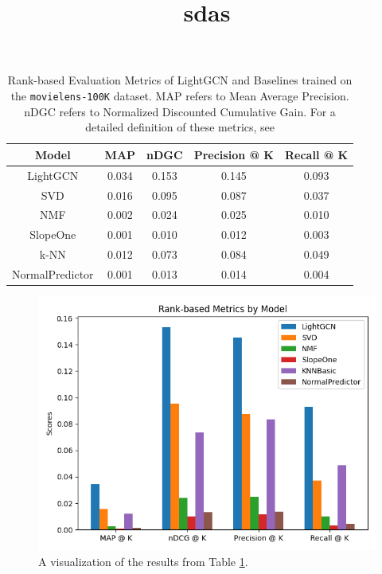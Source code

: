 \documentclass{article}
\begin{document}
\begin{table}[H]
    \centering
        \begin{tabular}{|c c c c c|} 
         \hline
         Model & MAP & nDGC & Precision @ K & Recall @ K \\ [0.5ex] 
         \hline\hline
         LightGCN & 0.034 & 0.153 & 0.145 & 0.093 \\ 
         \hline
         SVD & 0.016 & 0.095 & 0.087 & 0.037 \\
         \hline
         NMF & 0.002 & 0.024 & 0.025 & 0.010 \\ 
         \hline
         SlopeOne & 0.001 & 0.010 & 0.012 & 0.003 \\ 
         \hline
         k-NN & 0.012 & 0.073 & 0.084 & 0.049 \\ 
         \hline 
         NormalPredictor & 0.001 & 0.013 & 0.014 & 0.004 \\[1ex] 
         \hline
        \end{tabular}
    \title{sdas}
    \caption{Rank-based Evaluation Metrics of LightGCN and Baselines trained on the \texttt{movielens-100K} dataset. MAP refers to Mean Average Precision. nDGC refers to Normalized Discounted Cumulative Gain. For a detailed definition of these metrics, see \cite{metrics}}
    \label{tab:lightgcn-100k-results}
\end{table}

\begin{figure}
    \centering
    \includegraphics[width=.8\textwidth]{figs/lightgcn-movielens100k-eval.png}
    \caption{A visualization of the results from Table \ref{tab:lightgcn-100k-results}.}
    \label{fig:lightgcn-100k-eval}
\end{figure}

\pagebreak

{}

\end{document}
